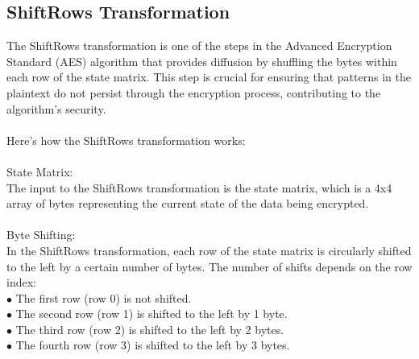 \documentclass{report}
\begin{document}
\subsection{ShiftRows Transformation}
The ShiftRows transformation is one of the steps in the Advanced Encryption Standard (AES) algorithm that provides diffusion by shuffling the bytes within each row of the state matrix. This step is crucial for ensuring that patterns in the plaintext do not persist through the encryption process, contributing to the algorithm's security.\\
\\
Here's how the ShiftRows transformation works:\\
\\
State Matrix:\\
The input to the ShiftRows transformation is the state matrix, which is a 4x4 array of bytes representing the current state of the data being encrypted.\\
\\
Byte Shifting:\\
In the ShiftRows transformation, each row of the state matrix is circularly shifted to the left by a certain number of bytes. The number of shifts depends on the row index:\\
$\bullet$ The first row (row 0) is not shifted.\\
$\bullet$ The second row (row 1) is shifted to the left by 1 byte.\\
$\bullet$ The third row (row 2) is shifted to the left by 2 bytes.\\
$\bullet$ The fourth row (row 3) is shifted to the left by 3 bytes.\\
\end{document}
